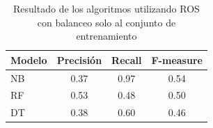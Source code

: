 \begin{table}[H]
\centering
\caption{Resultado de los algoritmos utilizando ROS con balanceo solo al conjunto de entrenamiento}
\captionsetup{labelsep=period, labelfont=bf}
\fontsize{12pt}{10pt}\selectfont
\begin{tabular}{lccc}
\toprule 
\textbf{Modelo} & \textbf{Precisión} & \textbf{Recall} & \textbf{F-measure} \\
\midrule  
NB & 0.37 & 0.97 & 0.54 \\
RF & 0.53 & 0.48 & 0.50 \\
DT & 0.38 & 0.60 & 0.46 \\
\bottomrule
\end{tabular}
\label{tab:results_ros_sin}
\end{table}
